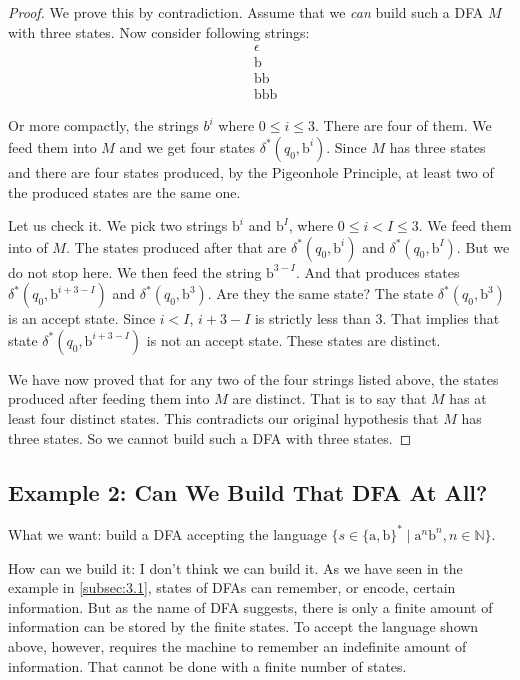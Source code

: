 \documentclass[11pt]{article}
\begin{document}
\begin{proof}
We prove this by contradiction. Assume that we \emph{can} build such a DFA $M$
with three states. Now consider following strings:
\begin{align*}
&\epsilon \\
&\mathrm{b} \\
&\mathrm{bb} \\
&\mathrm{bbb}
\end{align*}

Or more compactly, the strings $b^i$ where $0 \leq i \leq 3$. There are four of
them. We feed them into $M$ and we get four states $\delta ^ \ast(q_0, \mathrm{b}^i)$.
Since $M$ has three states and there are four states produced, by the
Pigeonhole Principle, at least two of the produced states are the same one.

Let us check it. We pick two strings $\mathrm{b}^i$ and $\mathrm{b}^I$, where $0 \leq i < I
\leq 3$. We feed them into of $M$. The states produced after that are $\delta ^
\ast(q_0, \mathrm{b}^i)$ and $\delta ^ \ast(q_0, \mathrm{b}^I)$. But we do not stop here. We then feed
the string $\mathrm{b}^{3-I}$. And that produces states $\delta ^ \ast(q_0, \mathrm{b}^{i + 3 - I})$
and $\delta ^ \ast(q_0, \mathrm{b}^3)$. Are they the same state? The state $\delta ^
\ast(q_0, \mathrm{b}^3)$ is an accept state. Since $i < I$, $i + 3 - I$ is strictly less
than $3$. That implies that state $\delta ^ \ast(q_0, \mathrm{b}^{i + 3 - I})$ is not an
accept state. These states are distinct.

We have now proved that for any two of the four strings listed above, the states
produced after feeding them into $M$ are distinct. That is to say that $M$ has
at least four distinct states. This contradicts our original hypothesis that
$M$ has three states. So we cannot build such a DFA with three states.
\end{proof}

\subsection{Example 2: Can We Build That DFA At All?}

What we want: build a DFA accepting the language $\{s \in \{\mathrm{a},\mathrm{b}\}^\ast \mid \mathrm{a}^n\mathrm{b}^n
, n \in \mathbb{N}\}$.

How can we build it: I don't think we can build it. As we have seen in the example
in \ref{subsec:3.1}, states of DFAs can remember, or encode, certain information.
But as the name of DFA suggests, there is only a finite amount of information can
be stored by the finite states. To accept the language shown above, however, requires
the machine to remember an indefinite amount of information. That cannot be done
with a finite number of states.
\end{document}
